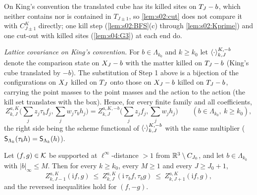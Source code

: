 On King's convention the translated cube has its killed sites on $T_J-b$, which neither contains nor is contained in $T_{J\pm1}$, so \cref{lem:s02:cut} does not compare it with $C^K_{J\pm1}$ directly; one kill step (\cref{lem:s02:BFS}(c) through \cref{lem:s02:Kprime}) and one cut-out with killed sites (\cref{lem:s04:G3}) at each end do.

\emph{Lattice covariance on King's convention.} For $b\in\Lambda_{k_0}$ and $k\ge k_0$ let $\langle \cdot\rangle^{K,-b}_{k,J}$ denote the comparison state on $X_J-b$ with the matter killed on $T_J-b$ (King's cube translated by $-b$). The substitution of Step 1 above is a bijection of the configurations on $X_J$ killed on $T_J$ onto those on $X_J-b$ killed on $T_J-b$, carrying the point masses to the point masses and the action to the action (the kill set translates with the box). Hence, for every finite family and all coefficients,
\begin{equation}\label{eq:s06:covK}
Z^{a,K}_{k,J}\Big(\sum_jz_j\tau_bf_j,\sum_jw_j\tau_bh_j\Big)=Z^{a,K,-b}_{k,J}\Big(\sum_jz_jf_j,\sum_jw_jh_j\Big)\qquad(b\in\Lambda_{k_0},\ k\ge k_0),
\end{equation}
the right side being the scheme functional of $\langle \cdot\rangle^{K,-b}_{k,J}$ with the same multiplier ($\mathsf S_{\Lambda_k}(\tau_bh)=\mathsf S_{\Lambda_k}(h)$).

\begin{lemma}\label{lem:s06:TK}
Let $(f,g)\in\mathcal K$ be supported at $\ell^\infty$-distance $>1$ from $\mathbb R^3\setminus C_{J_0}$, and let $b\in\Lambda_{k_0}$ with $|b|_\infty\le M$. Then for every $k\ge k_0$, every $M\ge1$ and every $J\ge J_0+1$,
\[
Z^{a,K}_{k,J-1}(\mathrm if,g)\ \le\ Z^{a,K}_{k,J}(\mathrm i\,\tau_bf,\tau_bg)\ \le\ Z^{a,K}_{k,J+1}(\mathrm if,g),
\]
and the reversed inequalities hold for $(f,-g)$.
\end{lemma}

